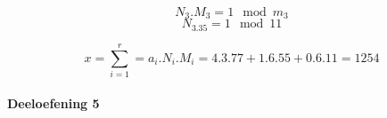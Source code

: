\documentclass[12pt]{article}
\begin{document}
    \begin{equation}
        N_3.M_3 = 1 \mod m_3
    \end{equation}
    \begin{equation}
        N_3.35 = 1 \mod 11
    \end{equation}
    
    \begin{equation}
        x = \sum_{i=1}^{r} = a_i.N_i.M_i = 4.3.77 + 1.6.55 + 0.6.11 = 1254
    \end{equation}

    \paragraph{Deeloefening 5}
\end{document}
